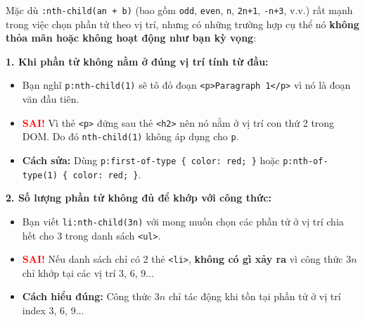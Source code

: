 \documentclass[11pt,oneside]{book}
\newcommand{\codeinline}[1]{\textcolor{accentOrange}{\texttt{#1}}}
\begin{document}
\begin{warnBox}
Mặc dù \codeinline{:nth-child(an + b)} (bao gồm \codeinline{odd}, \codeinline{even}, \codeinline{n}, \codeinline{2n+1}, \codeinline{-n+3}, v.v.) rất mạnh trong việc chọn phần tử theo vị trí, nhưng có những trường hợp cụ thể nó \textbf{không thỏa mãn hoặc không hoạt động như bạn kỳ vọng}:

\par\vspace{5pt}
\textbf{1. Khi phần tử không nằm ở đúng vị trí tính từ đầu:}
\begin{itemize}[leftmargin=1.5em, itemsep=2pt, parsep=0pt]
    \item Bạn nghĩ \codeinline{p:nth-child(1)} sẽ tô đỏ đoạn \codeinline{<p>Paragraph 1</p>} vì nó là đoạn văn đầu tiên.
    \item \textcolor{red}{\textbf{SAI!}} Vì thẻ \codeinline{<p>} đứng sau thẻ \codeinline{<h2>} nên nó nằm ở vị trí con thứ 2 trong DOM. Do đó \codeinline{nth-child(1)} không áp dụng cho \codeinline{p}.
    \item \textbf{Cách sửa:} Dùng \codeinline{p:first-of-type \{ color: red; \}} hoặc \codeinline{p:nth-of-type(1) \{ color: red; \}}.
\end{itemize}

\par\vspace{5pt}
\textbf{2. Số lượng phần tử không đủ để khớp với công thức:}
\begin{itemize}[leftmargin=1.5em, itemsep=2pt, parsep=0pt]
    \item Bạn viết \codeinline{li:nth-child(3n)} với mong muốn chọn các phần tử ở vị trí chia hết cho 3 trong danh sách \codeinline{<ul>}.
    \item \textcolor{red}{\textbf{SAI!}} Nếu danh sách chỉ có 2 thẻ \codeinline{<li>}, \textbf{không có gì xảy ra} vì công thức $3n$ chỉ khớp tại các vị trí 3, 6, 9...
    \item \textbf{Cách hiểu đúng:} Công thức $3n$ chỉ tác động khi tồn tại phần tử ở vị trí index 3, 6, 9...
\end{itemize}


\end{warnBox}
\end{document}
